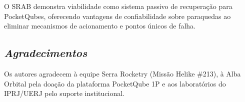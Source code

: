\documentclass[12pt,fleqn]{article}
\begin{document}
O SRAB demonstra viabilidade como sistema passivo de recuperação para PocketQubes, oferecendo vantagens de confiabilidade sobre paraquedas ao eliminar mecanismos de acionamento e pontos únicos de falha.


\subsection*{\textit{Agradecimentos}}

Os autores agradecem à equipe Serra Rocketry (Missão Helike \#213), à Alba Orbital pela doação da plataforma PocketQube 1P e aos laboratórios do IPRJ/UERJ pelo suporte institucional.



\fontsize{11}{0}\selectfont



\vspace{0.5cm}


\vspace{0.2cm}


\vspace{0.5cm}
\end{document}
